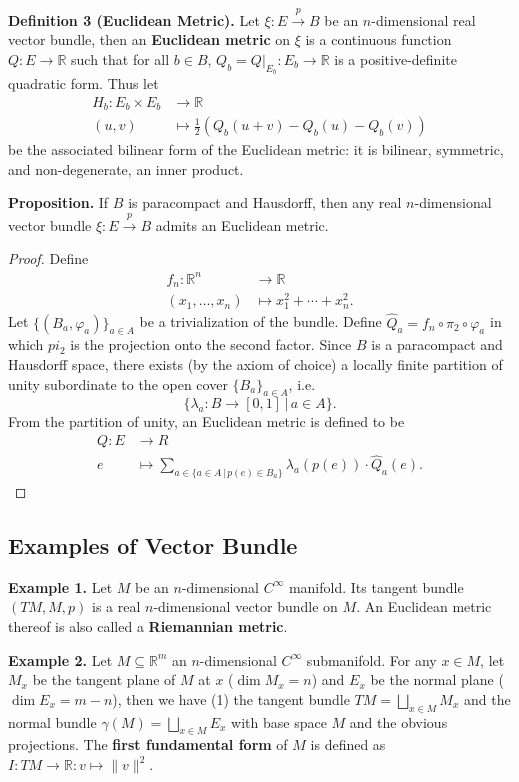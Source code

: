 \documentclass[10pt]{article}
\begin{document}
\textbf{Definition 3 (Euclidean Metric).} Let $\xi:E\overset{p}{\to}B$ be an $n$-dimensional real vector bundle, then an \textbf{Euclidean metric} on $\xi$ is a continuous function $Q:E\to\mathbb{R}$ such that for all $b\in B$, $Q_b=Q\big|_{E_b}:E_b\to\mathbb{R}$ is a positive-definite quadratic form. Thus let \begin{align*}H_b:E_b\times E_b&\to\mathbb{R}\\(u,v)&\mapsto\frac{1}{2}(Q_b(u+v)-Q_b(u)-Q_b(v))\end{align*} be the associated bilinear form of the Euclidean metric: it is bilinear, symmetric, and non-degenerate, an inner product.

\colorbox{red!30}{\textbf{Proposition.}} If $B$ is paracompact and Hausdorff, then any real $n$-dimensional vector bundle $\xi:E\overset{p}{\to}B$ admits an Euclidean metric.
\begin{proof}
Define \begin{align*}f_n:\mathbb{R}^n&\to\mathbb{R}\\(x_1,\dots,x_n)&\mapsto x_1^2+\cdots+x_n^2.\end{align*} Let $\{(B_a,\varphi_a)\}_{a\in A}$ be a trivialization of the bundle. Define $\hat{Q}_a=f_n\circ\pi_2\circ\varphi_a$ in which $pi_2$ is the projection onto the second factor. Since $B$ is a paracompact and Hausdorff space, there exists (by the axiom of choice) a locally finite partition of unity subordinate to the open cover $\{B_a\}_{a\in A}$, i.e. $$\{\lambda_a:B\to[0,1]\,\big|\,a\in A\}.$$ From the partition of unity, an Euclidean metric is defined to be \begin{align*}Q:E&\to R\\e&\mapsto\sum_{a\in\{a\in A\,|\,p(e)\in B_a\}}\lambda_a(p(e))\cdot\hat{Q}_a(e).\end{align*}
\end{proof}

\subsection{Examples of Vector Bundle}
\textbf{Example 1.} Let $M$ be an $n$-dimensional $C^\infty$ manifold. Its tangent bundle $(TM, M, p)$ is a real $n$-dimensional vector bundle on $M$. An Euclidean metric thereof is also called a \textbf{Riemannian metric}.

\textbf{Example 2.} Let $M\subseteq\mathbb{R}^m$ an $n$-dimensional $C^\infty$ submanifold. For any $x\in M$, let $M_x$ be the tangent plane of $M$ at $x$ ($\dim M_x=n$) and $E_x$ be the normal plane ($\dim E_x=m-n$), then we have (1) the tangent bundle $TM=\bigsqcup_{x\in M}M_x$ and the normal bundle $\gamma(M)=\bigsqcup_{x\in M}E_x$ with base space $M$ and the obvious projections. The \textbf{first fundamental form} of $M$ is defined as $I:TM\to\mathbb{R}:v\mapsto\lVert v\rVert^2$.
\end{document}
